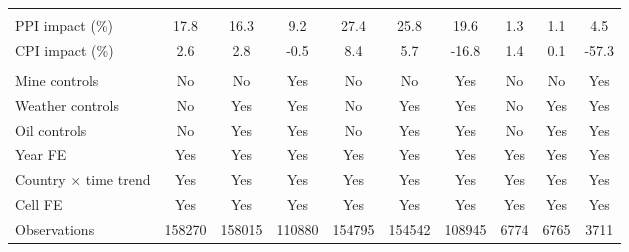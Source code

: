 {\begin{tabular}{l*{9}{c}}
\hline \\ PPI impact (\%)&        17.8         &        16.3         &         9.2         &        27.4         &        25.8         &        19.6         &         1.3         &         1.1         &         4.5         \\
CPI impact (\%)     &         2.6         &         2.8         &        -0.5         &         8.4         &         5.7         &       -16.8         &         1.4         &         0.1         &       -57.3         \\
\hline \\ Mine controls&          No         &          No         &         Yes         &          No         &          No         &         Yes         &          No         &          No         &         Yes         \\
Weather controls    &          No         &         Yes         &         Yes         &          No         &         Yes         &         Yes         &          No         &         Yes         &         Yes         \\
Oil controls        &          No         &         Yes         &         Yes         &          No         &         Yes         &         Yes         &          No         &         Yes         &         Yes         \\
Year FE             &         Yes         &         Yes         &         Yes         &         Yes         &         Yes         &         Yes         &         Yes         &         Yes         &         Yes         \\
Country $\times$ time trend&         Yes         &         Yes         &         Yes         &         Yes         &         Yes         &         Yes         &         Yes         &         Yes         &         Yes         \\
Cell FE             &         Yes         &         Yes         &         Yes         &         Yes         &         Yes         &         Yes         &         Yes         &         Yes         &         Yes         \\
Observations        &      158270         &      158015         &      110880         &      154795         &      154542         &      108945         &        6774         &        6765         &        3711         \\
\hline\hline
\end{tabular}
}
